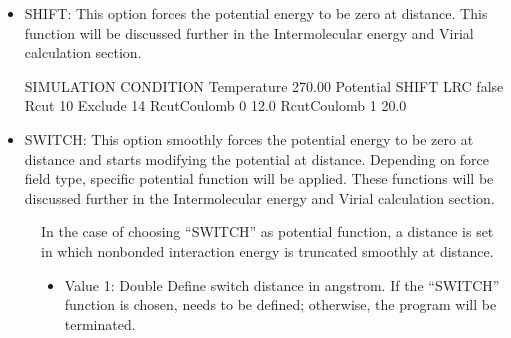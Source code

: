 \documentclass[letterpaper,10pt,english]{sphinxmanual}
\begin{document}
\begin{description}
\begin{itemize}
\begin{itemize}
\item {} 
\sphinxAtStartPar
SHIFT: This option forces the potential energy to be zero at  distance. This function will be discussed further in the Intermolecular energy and Virial calculation section.

\begin{sphinxVerbatim}[commandchars=\\\{\}]
\PYGZsh{}\PYGZsh{}\PYGZsh{}\PYGZsh{}\PYGZsh{}\PYGZsh{}\PYGZsh{}\PYGZsh{}\PYGZsh{}\PYGZsh{}\PYGZsh{}\PYGZsh{}\PYGZsh{}\PYGZsh{}\PYGZsh{}\PYGZsh{}\PYGZsh{}\PYGZsh{}\PYGZsh{}\PYGZsh{}\PYGZsh{}\PYGZsh{}\PYGZsh{}\PYGZsh{}\PYGZsh{}\PYGZsh{}\PYGZsh{}\PYGZsh{}\PYGZsh{}\PYGZsh{}\PYGZsh{}\PYGZsh{}\PYGZsh{}
\PYGZsh{} SIMULATION CONDITION
\PYGZsh{}\PYGZsh{}\PYGZsh{}\PYGZsh{}\PYGZsh{}\PYGZsh{}\PYGZsh{}\PYGZsh{}\PYGZsh{}\PYGZsh{}\PYGZsh{}\PYGZsh{}\PYGZsh{}\PYGZsh{}\PYGZsh{}\PYGZsh{}\PYGZsh{}\PYGZsh{}\PYGZsh{}\PYGZsh{}\PYGZsh{}\PYGZsh{}\PYGZsh{}\PYGZsh{}\PYGZsh{}\PYGZsh{}\PYGZsh{}\PYGZsh{}\PYGZsh{}\PYGZsh{}\PYGZsh{}\PYGZsh{}\PYGZsh{}
Temperature     270.00
Potential       SHIFT
LRC             false
Rcut            10
Exclude         1\PYGZhy{}4
RcutCoulomb  0  12.0
RcutCoulomb  1  20.0
\end{sphinxVerbatim}

\item {} 
\sphinxAtStartPar
SWITCH: This option smoothly forces the potential energy to be zero at  distance and starts modifying the potential at  distance. Depending on force field type, specific potential function will be applied. These functions will be discussed further in the Intermolecular energy and Virial calculation section.

\end{itemize}
\begin{description}
\item[{}] \leavevmode
\sphinxAtStartPar
In the case of choosing “SWITCH” as potential function, a distance is set in which non\sphinxhyphen{}bonded interaction energy is truncated smoothly at  distance.
\begin{itemize}
\item {} 
\sphinxAtStartPar
Value 1: Double \sphinxhyphen{} Define switch distance in angstrom. If the “SWITCH” function is chosen,  needs to be defined; otherwise, the program will be terminated.


\end{itemize}
\end{description}
\end{itemize}
\end{description}
\end{document}
